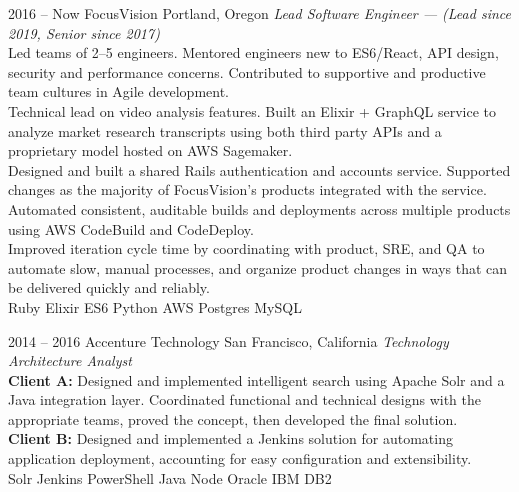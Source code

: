 \documentclass[]{friggeri-cv} %
\begin{document}
\begin{entrylist}


\entry
{2016 -- Now}
{FocusVision}
{Portland, Oregon}
{
  \emph{Lead Software Engineer --- (Lead since 2019, Senior since 2017)}
    \smallskip
    \\
    Led teams of 2--5 engineers. Mentored engineers new to ES6/React, API design,
    security and performance concerns. Contributed to supportive and productive
    team cultures in Agile development.
    \smallskip
    \\
    Technical lead on video analysis features. Built an Elixir + GraphQL
    service to analyze market research transcripts using both third party APIs
    and a proprietary model hosted on AWS Sagemaker.
    \smallskip
    \\
    Designed and built a shared Rails authentication and accounts service. Supported
    changes as the majority of FocusVision's products integrated with the service.
    \smallskip
    \\
    Automated consistent, auditable builds and deployments across multiple products using AWS CodeBuild and CodeDeploy.
    \smallskip
    \\
    Improved iteration cycle time by coordinating with product, SRE, and QA to
    automate slow, manual processes, and organize product changes in ways that can be
    delivered quickly and reliably.
    \smallskip
    \\
Ruby \mydot Elixir \mydot ES6 \mydot Python \mydot AWS \mydot Postgres \mydot MySQL}

\entry
{2014 -- 2016}
{Accenture Technology}
{San Francisco, California}
{\emph{Technology Architecture Analyst}
    \smallskip
    \\
    \textbf{Client A:} Designed and implemented intelligent search using Apache Solr and a Java integration layer. Coordinated functional and technical designs with the appropriate teams, proved the concept, then developed the final solution.
    \smallskip
    \\
    \textbf{Client B:} Designed and implemented a Jenkins solution for automating application deployment, accounting for easy configuration and extensibility.
    \smallskip
    \\
Solr \mydot Jenkins \mydot PowerShell \mydot Java \mydot Node \mydot Oracle \mydot IBM DB2}


\end{entrylist}
\end{document}
